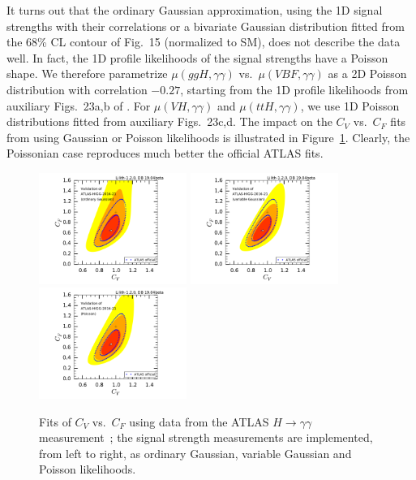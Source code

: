 \documentclass[submission, Phys]{SciPost}
\begin{document}
It turns out that the ordinary Gaussian approximation, using the 1D signal strengths with their correlations or 
a bivariate Gaussian distribution fitted from the 68\% CL contour of Fig.~15 (normalized to SM), does not describe the data well.
In fact, the 1D profile likelihoods of the signal strengths have a Poisson shape. 
We therefore parametrize $\mu(ggH,\gamma\gamma)$ vs.\ $\mu(VBF,\gamma\gamma)$ as a 2D Poisson distribution with correlation $-0.27$,  starting from the 1D profile likelihoods from auxiliary Figs.~23a,b of \cite{Aaboud:2018xdt}. For $\mu(VH,\gamma\gamma)$ and $\mu(ttH,\gamma\gamma)$, we use 1D Poisson distributions fitted from auxiliary Figs.~23c,d. 
The impact on the $C_V$ vs.\ $C_F$ fits from using Gaussian or Poisson likelihoods is illustrated 
in Figure~\ref{validation_atlas_gamgam}. Clearly, the Poissonian case reproduces much better the official ATLAS fits. 

\begin{figure}[h!]%
\hspace*{-8mm}\includegraphics[width=0.43\textwidth]{validation/ATLAS/HIGG-2016-21-CVCF-Gaussian.pdf}%
\hspace*{-12mm}\includegraphics[width=0.43\textwidth]{validation/ATLAS/HIGG-2016-21-CVCF-GaussianV2.pdf}%
\hspace*{-12mm}\includegraphics[width=0.43\textwidth]{validation/ATLAS/HIGG-2016-21-CVCF-Poisson.pdf} 
\caption{Fits of $C_V$ vs.\ $C_F$ using data from the ATLAS $H\to\gamma\gamma$ measurement~\cite{Aaboud:2018xdt}; 
the signal strength measurements are implemented, from left to right, as ordinary Gaussian, variable Gaussian and Poisson likelihoods.}
\label{validation_atlas_gamgam}
\end{figure}
 
\end{document}
